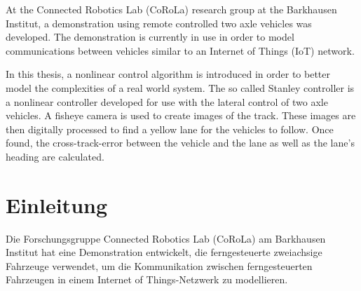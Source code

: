 \documentclass[arbeit=studie,oneside,BCOR=12mm]{ArbeitRST}
\begin{document}
{At the Connected Robotics Lab (CoRoLa) research group at the Barkhausen
Institut, a demonstration using remote controlled two axle vehicles was
developed. The demonstration is currently in use in order to model
communications between vehicles similar to an Internet of Things (IoT) network.

In this thesis, a nonlinear control algorithm is introduced in order to better
model the complexities of a real world system. The so called Stanley controller
\cite{stanley} is a nonlinear controller developed for use with the lateral control of two
axle vehicles. A fisheye camera is used to create images of the track. These
images are then digitally processed to find a yellow lane for the vehicles to
follow. Once found, the cross-track-error between the vehicle and the lane as
well as the lane's heading are calculated.}


\tableofcontents
{}

\chapter{Einleitung}

Die Forschungsgruppe Connected Robotics Lab (CoRoLa) am Barkhausen Institut hat
eine Demonstration entwickelt, die ferngesteuerte zweiachsige Fahrzeuge
verwendet, um die Kommunikation zwischen ferngesteuerten Fahrzeugen in einem
\glqq Internet of Things\grqq-Netzwerk zu modellieren.
\end{document}
